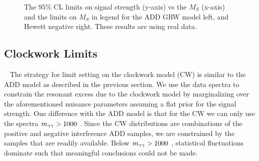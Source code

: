 \begin{figure}[!htbp]{
\caption{The 95\% CL limits on signal strength (y-axis) vs the $M_S$ (x-axis) and the limits on $M_S$ in legend for the ADD GRW model left, and Hewett negative right. These results are using real data. }
\label{fig:Limits_real}}
\end{figure}

\subsection{Clockwork Limits}~\label{sec:CWlimits}
The strategy for limit setting on the clockwork model (CW) is similar to the ADD model as described in the previous section. We use the data \mgg spectra to constrain the resonant excess due to the clockwork model by marginalizing over the aforementioned nuisance parameters assuming a flat prior for the signal strength. One difference with the ADD model is that for the CW we can only use the spectra $m_{\gamma\gamma}>1000$ \GeV. Since the CW distributions are combinations of the positive and negative interference ADD samples, we are constrained by the samples that are readily available. Below $m_{\gamma\gamma}>1000$ \GeV, statistical fluctuations dominate such that meaningful conclusions could not be made. 

